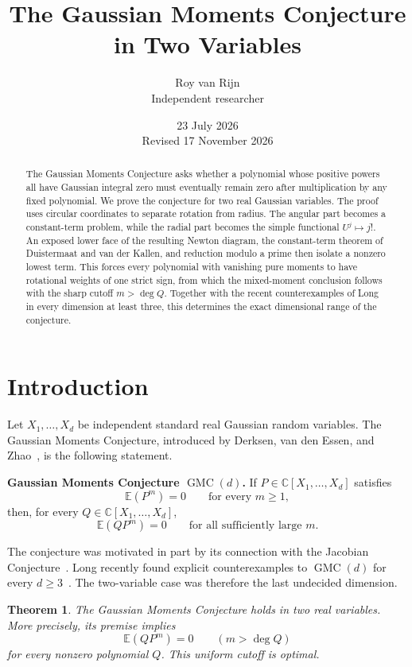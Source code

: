 \documentclass[11pt]{article}
\title{The Gaussian Moments Conjecture in Two Variables}
\author{Roy van Rijn\\{\small Independent researcher}}
\date{23 July 2026\\Revised 17 November 2026}
\newtheorem{theorem}{Theorem}[section]
\newcommand{\C}{\mathbb C}
\newcommand{\E}{\mathbb E}
\begin{document}
\maketitle

\begin{abstract}
The Gaussian Moments Conjecture asks whether a polynomial whose positive
powers all have Gaussian integral zero must eventually remain zero after
multiplication by any fixed polynomial.  We prove the conjecture for two
real Gaussian variables.  The proof uses circular coordinates to separate
rotation from radius.  The angular part becomes a constant-term problem,
while the radial part becomes the simple functional \(U^j\mapsto j!\).
An exposed lower face of the resulting Newton diagram, the constant-term
theorem of Duistermaat and van der Kallen, and reduction modulo a prime then
isolate a nonzero lowest term.  This forces every polynomial with vanishing
pure moments to have rotational weights of one strict sign, from which the
mixed-moment conclusion follows with the sharp cutoff \(m>\deg Q\).
Together with the recent
counterexamples of Long in every dimension at least three, this determines
the exact dimensional range of the conjecture.
\end{abstract}

\section{Introduction}

Let \(X_1,\ldots,X_d\) be independent standard real Gaussian random
variables.  The Gaussian Moments Conjecture, introduced by Derksen, van den
Essen, and Zhao~\cite{DVZ}, is the following statement.

\medskip
\noindent
\textbf{Gaussian Moments Conjecture \(\operatorname{GMC}(d)\).}
If \(P\in\C[X_1,\ldots,X_d]\) satisfies
\[
  \E(P^m)=0\qquad\text{for every }m\geq 1,
\]
then, for every \(Q\in\C[X_1,\ldots,X_d]\),
\[
  \E(QP^m)=0\qquad\text{for all sufficiently large }m.
\]

\medskip
The conjecture was motivated in part by its connection with the Jacobian
Conjecture~\cite{DVZ}.  Long recently found explicit counterexamples to
\(\operatorname{GMC}(d)\) for every \(d\geq3\)~\cite{Long}.  The
two-variable case was therefore the last undecided dimension.

\begin{theorem}\label{thm:main}
The Gaussian Moments Conjecture holds in two real variables.  More
precisely, its premise implies
\[
  \E(QP^m)=0\qquad(m>\deg Q)
\]
for every nonzero polynomial \(Q\).  This uniform cutoff is optimal.
\end{theorem}
\end{document}

